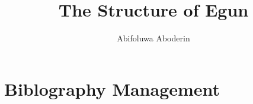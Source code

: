 \documentclass{article}
\author{Abifoluwa Aboderin}
\title{The Structure of Egun}
\begin{document}
\maketitle

\section{Biblography Management}
\end{document}
